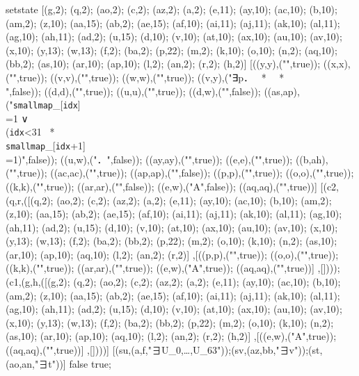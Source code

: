 setstate [(g,2); (q,2); (ao,2); (c,2); (az,2); (a,2); (e,11); (ay,10); (ac,10); (b,10); (am,2); (z,10); (aa,15); (ab,2); (ae,15); (af,10); (ai,11); (aj,11); (ak,10); (al,11); (ag,10); (ah,11); (ad,2); (u,15); (d,10); (v,10); (at,10); (ax,10); (au,10); (av,10); (x,10); (y,13); (w,13); (f,2); (ba,2); (p,22); (m,2); (k,10); (o,10); (n,2); (aq,10); (bb,2); (as,10); (ar,10); (ap,10); (l,2); (an,2); (r,2); (h,2)] [((y,y),("",true)); ((x,x),("",true)); ((v,v),("",true)); ((w,w),("",true)); ((v,y),("∃p．  *    *  {}\\{} ",false)); ((d,d),("",true)); ((u,u),("\mrot{\iterstar{i∈[0\upto32)\uplusminus{\tt idx}}．{}\\{} \smallbin{i}{U_i}}",true)); ((d,w),("",false)); ((as,ap),("{\tt smallmap}_{[{\tt idx}]}{}\\{} =1 ∨ {}\\{} ({\tt idx}<31  *  {}\\{} {\tt smallmap}_{[{\tt idx}+1]}{}\\{} =1)",false)); ((u,w),("．",false)); ((ay,ay),("",true)); ((e,e),("",true)); ((b,ah),("",true)); ((ac,ac),("",true)); ((ap,ap),("",false)); ((p,p),("",true)); ((o,o),("",true)); ((k,k),("",true)); ((ar,ar),("",false)); ((e,w),("\state A",false)); ((aq,aq),("",true))] [(c2,(q,r,([(q,2); (ao,2); (c,2); (az,2); (a,2); (e,11); (ay,10); (ac,10); (b,10); (am,2); (z,10); (aa,15); (ab,2); (ae,15); (af,10); (ai,11); (aj,11); (ak,10); (al,11); (ag,10); (ah,11); (ad,2); (u,15); (d,10); (v,10); (at,10); (ax,10); (au,10); (av,10); (x,10); (y,13); (w,13); (f,2); (ba,2); (bb,2); (p,22); (m,2); (o,10); (k,10); (n,2); (as,10); (ar,10); (ap,10); (aq,10); (l,2); (an,2); (r,2)] ,[((p,p),("\mrot{∀i∈[0\upto32-{\tt idx})．{}\\{}{\tt smallbits}_{[i]} = {}\\{} {\tt smallmap}_{[i+{\tt idx}]}}",true)); ((o,o),("",true)); ((k,k),("",true)); ((ar,ar),("",true)); ((e,w),("\state A",true)); ((aq,aq),("",true))] ,[]))); (c1,(g,h,([(g,2); (q,2); (ao,2); (c,2); (az,2); (a,2); (e,11); (ay,10); (ac,10); (b,10); (am,2); (z,10); (aa,15); (ab,2); (ae,15); (af,10); (ai,11); (aj,11); (ak,10); (al,11); (ag,10); (ah,11); (ad,2); (u,15); (d,10); (v,10); (at,10); (ax,10); (au,10); (av,10); (x,10); (y,13); (w,13); (f,2); (ba,2); (bb,2); (p,22); (m,2); (o,10); (k,10); (n,2); (as,10); (ar,10); (ap,10); (aq,10); (l,2); (an,2); (r,2); (h,2)] ,[((e,w),("\state A",true)); ((aq,aq),("",true))] ,[])))] [(su,(a,f,"∃U_0,\ldots,U_{63}"));(sv,(az,bb,"∃v"));(st,(ao,an,"∃t"))] false true;
